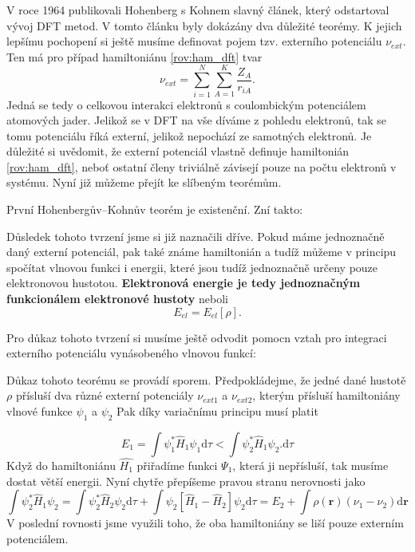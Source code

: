 V roce 1964 publikovali Hohenberg s Kohnem slavný článek, který odstartoval vývoj DFT metod.
V tomto článku byly dokázány dva důležité teorémy. K jejich lepšímu pochopení si ještě musíme definovat pojem tzv. externího potenciálu $\nu_{ext}$. Ten má pro případ hamiltoniánu \eqref{rov:ham_dft} tvar
\begin{equation}
\nu_{ext} = \sum_{i=1}^N\sum_{A=1}^K \frac{Z_A}{r_{iA}} .
\end{equation} 
Jedná se tedy o celkovou interakci elektronů s coulombickým potenciálem atomových jader. Jelikož se v DFT na vše díváme z pohledu elektronů, tak se tomu potenciálu říká externí, jelikož nepochází ze samotných elektronů. Je důležité si uvědomit, že externí potenciál vlastně definuje hamiltonián \ref{rov:ham_dft}, neboť ostatní členy triviálně závisejí pouze na počtu elektronů v systému. Nyní již můžeme přejít ke slíbeným teorémům.

První Hohenbergův--Kohnův teorém je existenční. Zní takto:

Důsledek tohoto tvrzení jsme si již naznačili dříve. Pokud máme jednoznačně daný externí potenciál, pak také známe hamiltonián a tudíž můžeme v principu spočítat vlnovou funkci i energii, které jsou tudíž jednoznačně určeny pouze elektronovou hustotou. \textbf{Elektronová energie je tedy jednoznačným funkcionálem elektronové hustoty} neboli
\begin{equation}
E_{el}=E_{el}[\rho] .
\end{equation}

Pro důkaz tohoto tvrzení si musíme ještě odvodit pomocn vztah pro integraci externího potenciálu vynásobeného vlnovou funkcí:

Důkaz tohoto teorému se provádí sporem. Předpokládejme, že jedné dané hustotě $\rho$ přísluší dva různé externí potenciály $\nu_{ext1}$ a $\nu_{ext2}$, kterým přísluší hamiltoniány vlnové funkce $\psi_1$ a $\psi_2$  Pak díky variačnímu principu musí platit

\begin{equation}
E_1 = \int \psi_1^* \hat{H}_1 \psi_1 \mathrm{d}\tau < \int \psi_2^* \hat{H}_1 \psi_2 . \mathrm{d}\tau
\end{equation}
Když do hamiltoniánu $\hat{H_1}$ přiřadíme funkci $\Psi_1$, která ji nepřísluší, tak musíme dostat větší energii. Nyní chytře přepíšeme pravou stranu nerovnosti jako  
\begin{equation}
\int \psi_2^* \hat{H}_1 \psi_2 = \int \psi_2^* \hat{H}_2 \psi_2\mathrm{d}\tau  + \int \psi_2 \left[\hat{H}_1-\hat{H}_2\right] \psi_2\mathrm{d}\tau = E_2 + \int \rho(\mathbf{r})(\nu_1-\nu_2)\mathrm{d}\mathbf{r}  
\end{equation}
V poslední rovnosti jsme využili toho, že oba hamiltoniány se liší pouze externím potenciálem.

